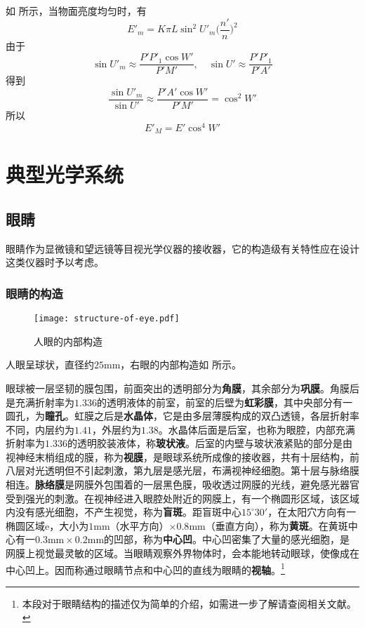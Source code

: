 \documentclass[cn,10pt,chinesefont=founder,math=newtx,cite=super,twoside]{elegantbook}
\begin{document}
如 所示，当物面亮度均匀时，有
\begin{equation}
E'_m=K\pi L\sin^2U'_m\bigg(\frac{n'}{n}\bigg)^2
\end{equation}
由于
\begin{equation}
\sin U'_m\approx\frac{P'P'_1\cos W'}{P'M'},\quad\sin U'\approx\frac{P'P'_1}{P'A'}
\end{equation}
得到
\begin{equation}
\frac{\sin U'_m}{\sin U'}\approx\frac{P'A'\cos W'}{P'M'}=\cos^2 W'
\end{equation}
所以
\begin{equation}
E'_M=E'\cos^4 W'
\end{equation}

\chapter{典型光学系统}

\section{眼睛}

眼睛作为显微镜和望远镜等目视光学仪器的接收器，它的构造级有关特性应在设计这类仪器时予以考虑。

\subsection{眼睛的构造}

\begin{figure}[htbp]
	\centering
	\texttt{[image: structure-of-eye.pdf]}
	\caption{人眼的内部构造}
	\label{fig:structure-of-eye}
\end{figure}

人眼呈球状，直径约$25\mathrm{mm}$，右眼的内部构造如 所示。

眼球被一层坚韧的膜包围，前面突出的透明部分为\textbf{角膜}，其余部分为\textbf{巩膜}。角膜后是充满折射率为$1.336$的透明液体的前室，前室的后壁为\textbf{虹彩膜}，其中央部分有一圆孔，为\textbf{瞳孔}。虹膜之后是\textbf{水晶体}，它是由多层薄膜构成的双凸透镜，各层折射率不同，内层约为$1.41$，外层约为$1.38$。水晶体后面是后室，也称为眼腔，内部充满折射率为$1.336$的透明胶装液体，称\textbf{玻状液}。后室的内壁与玻状液紧贴的部分是由视神经末梢组成的膜，称为\textbf{视膜}，是眼球系统所成像的接收器，共有十层结构，前八层对光透明但不引起刺激，第九层是感光层，布满视神经细胞。第十层与脉络膜相连。\textbf{脉络膜}是网膜外包围着的一层黑色膜，吸收透过网膜的光线，避免感光器官受到强光的刺激。在视神经进入眼腔处附近的网膜上，有一个椭圆形区域，该区域内没有感光细胞，不产生视觉，称为\textbf{盲斑}。距盲斑中心$15^{\circ}30'$，在太阳穴方向有一椭圆区域e，大小为$1\mathrm{mm}$（水平方向）$\times0.8\mathrm{mm}$（垂直方向），称为\textbf{黄斑}。在黄斑中心有一$0.3\mathrm{mm}\times0.2\mathrm{mm}$的凹部，称为\textbf{中心凹}。中心凹密集了大量的感光细胞，是网膜上视觉最灵敏的区域。当眼睛观察外界物体时，会本能地转动眼球，使像成在中心凹上。因而称通过眼睛节点和中心凹的直线为眼睛的\textbf{视轴}。\footnote{本段对于眼睛结构的描述仅为简单的介绍，如需进一步了解请查阅相关文献。}
\end{document}
